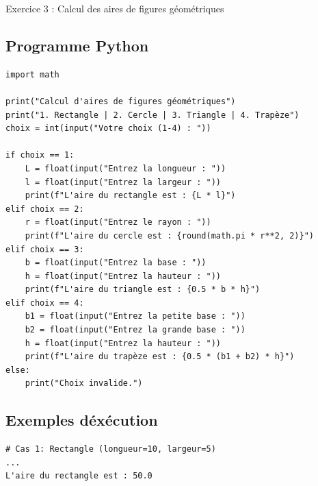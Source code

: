 \documentclass[10pt,a4paper]{article}
\begin{document}
\begin{exoBox}{Exercice 3 : Calcul des aires de figures géométriques}
\subsection*{Programme Python}
\noindent
\begin{minipage}{\linewidth}
\begin{lstlisting}
import math

print("Calcul d'aires de figures géométriques")
print("1. Rectangle | 2. Cercle | 3. Triangle | 4. Trapèze")
choix = int(input("Votre choix (1-4) : "))

if choix == 1:
    L = float(input("Entrez la longueur : "))
    l = float(input("Entrez la largeur : "))
    print(f"L'aire du rectangle est : {L * l}")
elif choix == 2:
    r = float(input("Entrez le rayon : "))
    print(f"L'aire du cercle est : {round(math.pi * r**2, 2)}")
elif choix == 3:
    b = float(input("Entrez la base : "))
    h = float(input("Entrez la hauteur : "))
    print(f"L'aire du triangle est : {0.5 * b * h}")
elif choix == 4:
    b1 = float(input("Entrez la petite base : "))
    b2 = float(input("Entrez la grande base : "))
    h = float(input("Entrez la hauteur : "))
    print(f"L'aire du trapèze est : {0.5 * (b1 + b2) * h}")
else:
    print("Choix invalide.")
\end{lstlisting}
\end{minipage}

\subsection*{Exemples d\'exécution}
\begin{verbatim}
# Cas 1: Rectangle (longueur=10, largeur=5)
...
L'aire du rectangle est : 50.0
\end{verbatim}
\end{exoBox}
\vspace{0.5cm}
\end{document}

